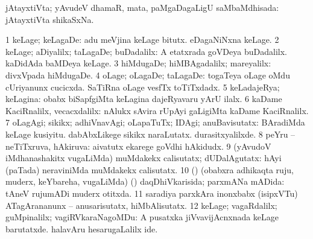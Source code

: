 \bentry
{} 
\gl{\gu}
\expl{}
\bmng
 jAtayxtiVta; yAvudeV dhamaR, mata, paMgaDagaLigU saMbaMdhisada:  jAtayxtiVta shikaSxNa. 
\emng
\eentry

\bentry
{} 
\gl{\upa}
\bmng
\bnum
\num{1} keLage; keLagaDe:  adu meVjina keLage bitutx.  eDagaNiNxna keLage. 
\num{2} keLage; aDiyalilx; taLagaDe; buDadalilx:  A etatxrada goVDeya buDadalilx.  kaDidAda baMDeya keLage. 
\num{3} hiMdugaDe; hiMBAgadalilx; mareyalilx:  divxVpada hiMdugaDe. 
\num{4} oLage; oLagaDe; taLagaDe:  togaTeya oLage oMdu cUriyanunx cucicxda.  SaTiRna oLage vesfTx toTiTxdadx. 
\num{5} keLadajeRya; keLagina:  obabx biSapfgiMta keLagina dajeRyavaru yArU ilalx. 
\num{6} kaDame KaciRnalilx, vecacxdalilx:  nAlukx sAvira rUpAyi gaLigiMta kaDame KaciRnalilx. 
\num{7} oLagAgi; sikikx; adhiVnavAgi; oLapaTuTx; IDAgi; anuBavisutatx:  BAradiMda keLage kusiyitu.  dabAbxLikege sikikx naraLutatx.  durasitxyalilxde. 
\num{8} peYru -- neTiTxruva, hAkiruva:  aivatutx ekarege goVdhi hAkidudx. 
\num{9} (yAvudoV iMdhanashakitx \mo vugaLiMda) muMdakekx calisutatx; dUDalAgutatx:  hAyi (paTada) neraviniMda muMdakekx calisutatx. 
\num{10} (\pArxparx) (obabxra adhikaqta ruju, muderx, keYbareha, \mo vugaLiMda) (\kanmu) daqDhiVkarisida; parxmANa mADida:  tAneV rujumADi muderx otitxda. 
\num{11} saradiya parxkAra inonxbabx (isipxVTu) ATagArananunx -- anusarisutatx, hiMbAlisutatx. 
\num{12} keLage; vagaRdalilx; guMpinalilx; vagiRVkaraNagoMDu:  A pusatxka jiVvavijAcnxnada keLage barutatxde.  halavAru hesarugaLalilx ide. 
\enum
\emng

